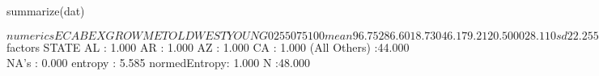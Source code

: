 \begin{Schunk}
\begin{Sinput}
 summarize(dat)
\end{Sinput}
\begin{Soutput}
$numerics
       ECAB      EX    GROW    MET    OLD    WEST  YOUNG
0%    57.40  183.00  -7.400   0.00  5.400  0.0000 24.000
25%   85.40  253.50   6.975  24.10  7.950  0.0000 26.400
50%   95.30  285.50  14.050  46.15  9.450  0.5000 28.000
75%  105.10  324.00  22.670  69.97 10.420  1.0000 29.630
100% 205.00  454.00  77.800  86.50 11.900  1.0000 32.900
mean  96.75  286.60  18.730  46.17  9.212  0.5000 28.110
sd    22.25   58.79  18.870  26.94  1.639  0.5053  2.149
var  495.20 3457.00 356.300 725.70  2.687  0.2553  4.616
NA's   0.00    0.00   0.000   0.00  0.000  0.0000  0.000
N     48.00   48.00  48.000  48.00 48.000 48.0000 48.000

$factors
           STATE       
 AL           : 1.000  
 AR           : 1.000  
 AZ           : 1.000  
 CA           : 1.000  
 (All Others) :44.000  
 NA's         : 0.000  
 entropy      : 5.585  
 normedEntropy: 1.000  
 N            :48.000  
\end{Soutput}
\end{Schunk}
